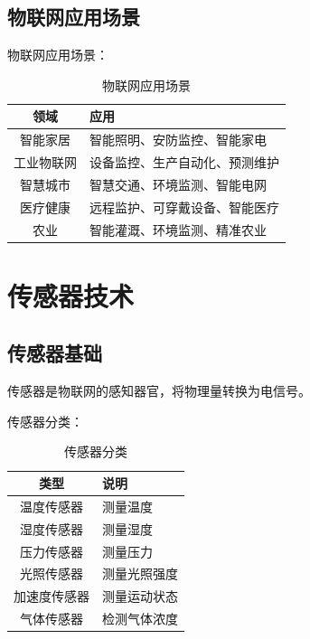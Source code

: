 \documentclass[12pt,UTF8]{ctexbook}
\begin{document}
\section{物联网应用场景}
\label{sec:iot_applications}

物联网应用场景：
\begin{table}[htbp]
    \centering
    \caption{物联网应用场景}
    \begin{tabular}{|c|p{8cm}|}
        \hline
        \textbf{领域} & \textbf{应用} \\
        \hline
        智能家居 & 智能照明、安防监控、智能家电 \\
        \hline
        工业物联网 & 设备监控、生产自动化、预测维护 \\
        \hline
        智慧城市 & 智慧交通、环境监测、智能电网 \\
        \hline
        医疗健康 & 远程监护、可穿戴设备、智能医疗 \\
        \hline
        农业 & 智能灌溉、环境监测、精准农业 \\
        \hline
    \end{tabular}
\end{table}

\chapter{传感器技术}
\label{chap:sensors}

\section{传感器基础}
\label{sec:sensor_basics}

传感器是物联网的感知器官，将物理量转换为电信号。

传感器分类：
\begin{table}[htbp]
    \centering
    \caption{传感器分类}
    \begin{tabular}{|c|p{8cm}|}
        \hline
        \textbf{类型} & \textbf{说明} \\
        \hline
        温度传感器 & 测量温度 \\
        \hline
        湿度传感器 & 测量湿度 \\
        \hline
        压力传感器 & 测量压力 \\
        \hline
        光照传感器 & 测量光照强度 \\
        \hline
        加速度传感器 & 测量运动状态 \\
        \hline
        气体传感器 & 检测气体浓度 \\
        \hline
    \end{tabular}
\end{table}
\end{document}
